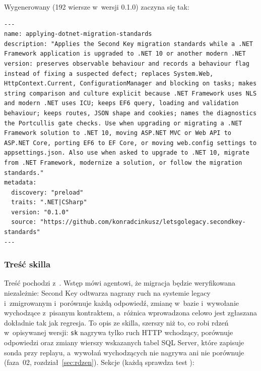 Wygenerowany  (192 wiersze
w~wersji 0.1.0) zaczyna się tak:

\begin{lstlisting}
---
name: applying-dotnet-migration-standards
description: "Applies the Second Key migration standards while a .NET Framework application is upgraded to .NET 10 or another modern .NET version: preserves observable behaviour and records a behaviour flag instead of fixing a suspected defect; replaces System.Web, HttpContext.Current, ConfigurationManager and blocking on tasks; makes string comparison and culture explicit because .NET Framework uses NLS and modern .NET uses ICU; keeps EF6 query, loading and validation behaviour; keeps routes, JSON shape and cookies; names the diagnostics the Portcullis gate checks. Use when upgrading or migrating a .NET Framework solution to .NET 10, moving ASP.NET MVC or Web API to ASP.NET Core, porting EF6 to EF Core, or moving web.config settings to appsettings.json. Also use when asked to upgrade to .NET 10, migrate from .NET Framework, modernize a solution, or follow the migration standards."
metadata:
  discovery: "preload"
  traits: ".NET|CSharp"
  version: "0.1.0"
  source: "https://github.com/konradcinkusz/letsgolegacy.secondkey-standards"
---
\end{lstlisting}

\subsubsection{Treść skilla}

Treść pochodzi z~. Wstęp mówi agentowi, że migracja będzie
weryfikowana niezależnie: Second Key odtwarza nagrany ruch na systemie legacy i~zmigrowanym
i~porównuje każdą odpowiedź, zmianę w~bazie i~wywołanie wychodzące z~pisanym kontraktem,
a~różnica wprowadzona celowo jest zgłaszana dokładnie tak jak regresja. To opis ze skilla,
szerszy niż to, co robi rdzeń w~opisywanej wersji: \texttt{sk} nagrywa tylko ruch HTTP
wchodzący, porównuje odpowiedzi oraz zmiany wierszy wskazanych tabel SQL Server, które
zapisuje sonda przy replayu, a~wywołań wychodzących nie nagrywa ani nie porównuje
(faza~02, rozdział~\ref{sec:rdzen}). Sekcje (każdą sprawdza test
):

